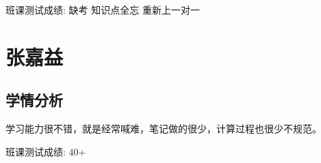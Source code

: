 \documentclass{article}
\begin{document}
班课测试成绩: 缺考 知识点全忘 重新上一对一
\vspace{2em}

\section{张嘉益}

\begin{center}
\end{center}

\subsection{学情分析}
学习能力很不错，就是经常喊难，笔记做的很少，计算过程也很少不规范。

班课测试成绩: 40+
\end{document}
